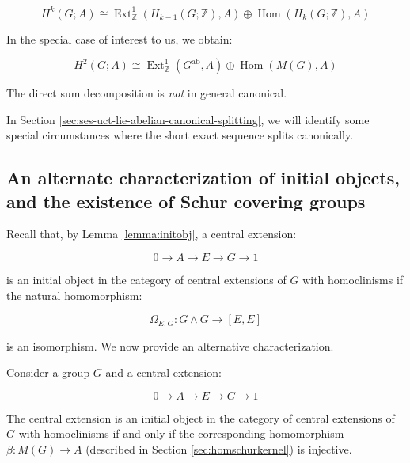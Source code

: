 \documentclass{ucetd}
\begin{document}
$$H^k(G;A) \cong \operatorname{Ext}^1_{\mathbb{Z}}(H_{k-1}(G;\mathbb{Z}),A) \oplus \operatorname{Hom}(H_k(G;\mathbb{Z}),A)$$

In the special case of interest to us, we obtain:

$$H^2(G;A) \cong \operatorname{Ext}^1_{\mathbb{Z}}(G^{\operatorname{ab}},A) \oplus \operatorname{Hom}(M(G),A)$$

The direct sum decomposition is {\em not} in general canonical. %

In Section \ref{sec:ses-uct-lie-abelian-canonical-splitting}, we will identify some
special circumstances where the short exact sequence splits
canonically.

\subsection{An alternate characterization of initial objects, and the existence of Schur covering groups}

Recall that, by Lemma \ref{lemma:initobj}, a central extension:

$$0 \to A \to E \to G \to 1$$

is an initial object in the category of central extensions of $G$ with
homoclinisms if the natural homomorphism:

$$\Omega_{E,G}: G \wedge G \to [E,E]$$

is an isomorphism. We now provide an alternative characterization.

\begin{lemma}\label{lemma:initial-beta-injective}
  Consider a group $G$ and a central extension:

  $$0 \to A \to E \to G \to 1$$

  The central extension is an initial object in the category of
  central extensions of $G$ with homoclinisms if and only if the
  corresponding homomorphism $\beta:M(G) \to A$ (described in Section
  \ref{sec:homschurkernel}) is injective.
\end{lemma}
\end{document}
